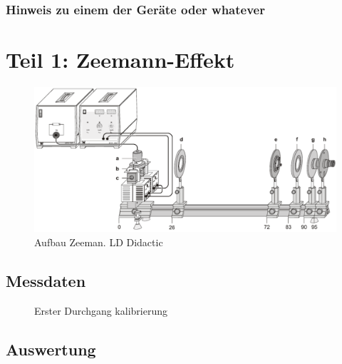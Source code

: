 \documentclass[11pt, a4paper]{article}
\begin{document}
\subsubsection{Hinweis zu einem der Geräte oder whatever}

\section{Teil 1: Zeemann-Effekt}
\begin{figure}[h]
	\centering
	\includegraphics[width=1.0\textwidth]{./figures/aufbau_zeeman.pdf}
	\caption{Aufbau Zeeman. LD Didactic}
	\label{fig:aufbau_zeeman}
\end{figure}


\subsection{Messdaten}

\begin{figure}[h]
\centering

\caption{Erster Durchgang kalibrierung}
\label{fig:kalibrierung1}
\end{figure}

\subsection{Auswertung}
\end{document}

